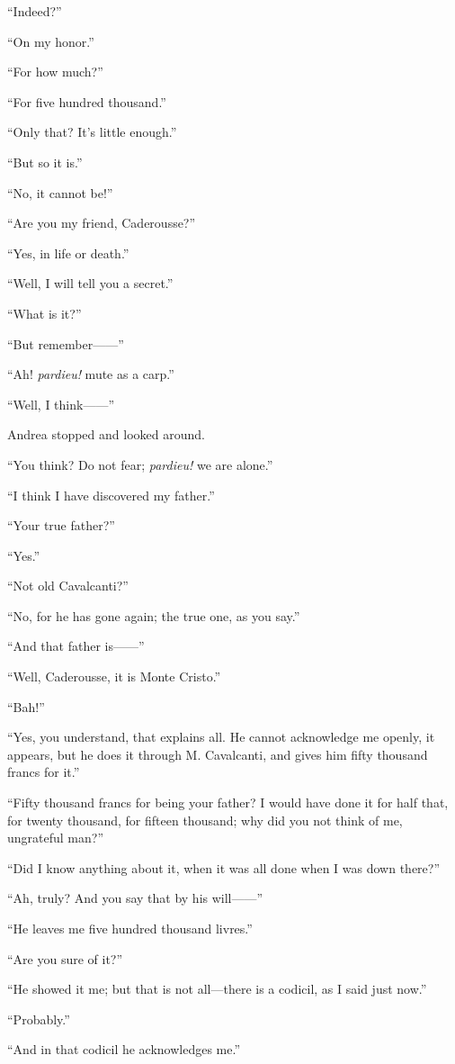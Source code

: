 “Indeed?”

“On my honor.”

“For how much?”

“For five hundred thousand.”

“Only that? It’s little enough.”

“But so it is.”

“No, it cannot be!”

“Are you my friend, Caderousse?”

“Yes, in life or death.”

“Well, I will tell you a secret.”

“What is it?”

“But remember——”

“Ah! \textit{pardieu!} mute as a carp.”

“Well, I think——”

Andrea stopped and looked around.

“You think? Do not fear; \textit{pardieu!} we are alone.”

“I think I have discovered my father.”

“Your true father?”

“Yes.”

“Not old Cavalcanti?”

“No, for he has gone again; the true one, as you say.”

“And that father is——”

“Well, Caderousse, it is Monte Cristo.”

“Bah!”

“Yes, you understand, that explains all. He cannot acknowledge me
openly, it appears, but he does it through M. Cavalcanti, and gives him
fifty thousand francs for it.”

“Fifty thousand francs for being your father? I would have done it for
half that, for twenty thousand, for fifteen thousand; why did you not
think of me, ungrateful man?”

“Did I know anything about it, when it was all done when I was down
there?”

“Ah, truly? And you say that by his will——”

“He leaves me five hundred thousand livres.”

“Are you sure of it?”

“He showed it me; but that is not all—there is a codicil, as I said
just now.”

“Probably.”

“And in that codicil he acknowledges me.”

